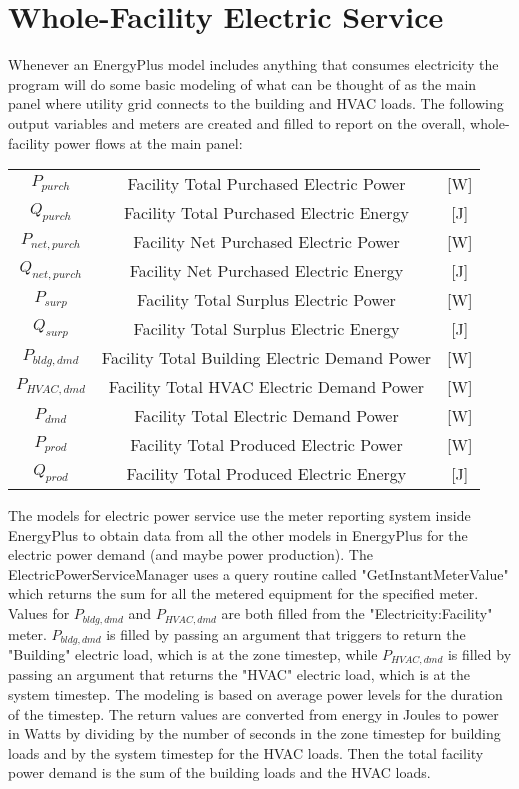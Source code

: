 \section{Whole-Facility Electric Service}\label{section-whole-facility-electric-service}

Whenever an EnergyPlus model includes anything that consumes electricity the program will do some basic modeling of what can be thought of as the main panel where utility grid connects to the building and HVAC loads.  The following output variables and meters are created and filled to report on the overall, whole-facility power flows at the main panel: 

\begin{tabular}{c|c|c}
  ${P_{purch}}$ &    Facility Total Purchased Electric Power & [W] \tabularnewline
  ${Q_{purch}}$ &    Facility Total Purchased Electric Energy & [J] \tabularnewline
  ${P_{net,purch}}$ &    Facility Net Purchased Electric Power & [W] \tabularnewline
  ${Q_{net,purch}}$ &    Facility Net Purchased Electric Energy & [J] \tabularnewline
  ${P_{surp}}$ &    Facility Total Surplus Electric Power & [W] \tabularnewline
  ${Q_{surp}}$ &    Facility Total Surplus Electric Energy & [J] \tabularnewline
  ${P_{bldg,dmd}}$ &    Facility Total Building Electric Demand Power & [W] \tabularnewline
  ${P_{HVAC,dmd}}$ &    Facility Total HVAC Electric Demand Power & [W] \tabularnewline
  ${P_{dmd}}$ &    Facility Total Electric Demand Power & [W] \tabularnewline
  ${P_{prod}}$ &    Facility Total Produced Electric Power & [W] \tabularnewline
  ${Q_{prod}}$ &   Facility Total Produced Electric Energy & [J]
\end{tabular}

The models for electric power service use the meter reporting system inside EnergyPlus to obtain data from all the other models in EnergyPlus for the electric power demand (and maybe power production).  The ElectricPowerServiceManager uses a query routine called "GetInstantMeterValue" which returns the sum for all the metered equipment for the specified meter.  Values for   $P_{bldg,dmd}$ and $P_{HVAC,dmd}$ are both filled from the "Electricity:Facility" meter.  $P_{bldg,dmd}$ is filled by passing an argument that triggers to return the "Building" electric load, which is at the zone timestep, while $P_{HVAC,dmd}$ is filled by passing an argument that returns the "HVAC" electric load, which is at the system timestep.  The modeling is based on average power levels for the duration of the timestep. The return values are converted from energy in Joules to power in Watts by dividing by the number of seconds in the zone timestep for building loads and by the system timestep for the HVAC loads.  Then the total facility power demand is the sum of the building loads and the HVAC loads. 

